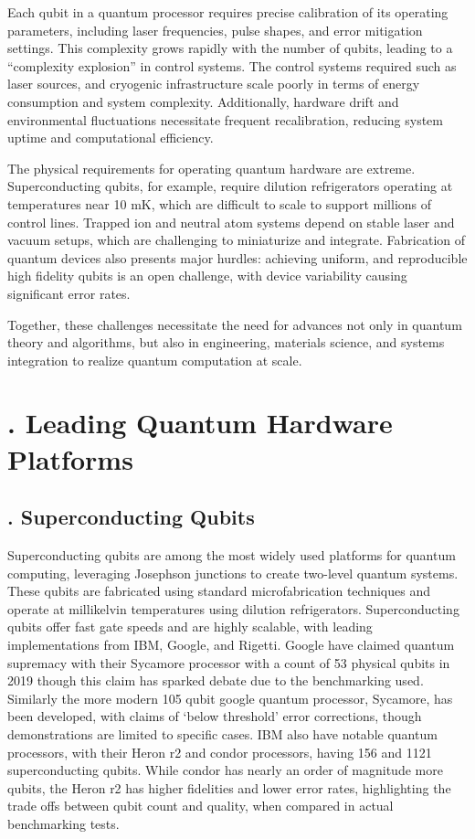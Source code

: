\documentclass{elbioimp2}
\begin{document}
Each qubit in a quantum processor requires precise calibration of its operating parameters, including laser frequencies, pulse shapes, and error mitigation settings. This complexity grows rapidly with the number of qubits, leading to a “complexity explosion” in control systems. The control systems required such as laser sources, and cryogenic infrastructure scale poorly in terms of energy consumption and system complexity. Additionally, hardware drift and environmental fluctuations necessitate frequent recalibration, reducing system uptime and computational efficiency.

The physical requirements for operating quantum hardware are extreme. Superconducting qubits, for example, require dilution refrigerators operating at temperatures near 10 mK, which are difficult to scale to support millions of control lines. Trapped ion and neutral atom systems depend on stable laser and vacuum setups, which are challenging to miniaturize and integrate. Fabrication of quantum devices also presents major hurdles: achieving uniform, and reproducible high fidelity qubits is an open challenge, with device variability causing significant error rates.

Together, these challenges necessitate the need for advances not only in quantum theory and algorithms, but also in engineering, materials science, and systems integration to realize quantum computation at scale.


\section{. Leading Quantum Hardware Platforms}
\subsection{. Superconducting Qubits}
Superconducting qubits are among the most widely used platforms for quantum computing, leveraging Josephson junctions to create two-level quantum systems. These qubits are fabricated using standard microfabrication techniques and operate at millikelvin temperatures using dilution refrigerators. Superconducting qubits offer fast gate speeds and are highly scalable, with leading implementations from IBM, Google, and Rigetti. Google have claimed quantum supremacy with their Sycamore processor with a count of 53 physical qubits in 2019 though this claim has sparked debate due to the benchmarking used. Similarly the more modern 105 qubit google quantum processor, Sycamore, has been developed, with claims of `below threshold' error corrections, though demonstrations are limited to specific cases\cite{google2025}. IBM also have notable quantum processors, with their Heron r2 and condor processors, having 156 and 1121 superconducting qubits. While condor has nearly an order of magnitude more qubits, the Heron r2 has higher fidelities and lower error rates, highlighting the trade offs between qubit count and quality, when compared in actual benchmarking tests\cite{postquantum2024}.
\end{document}

